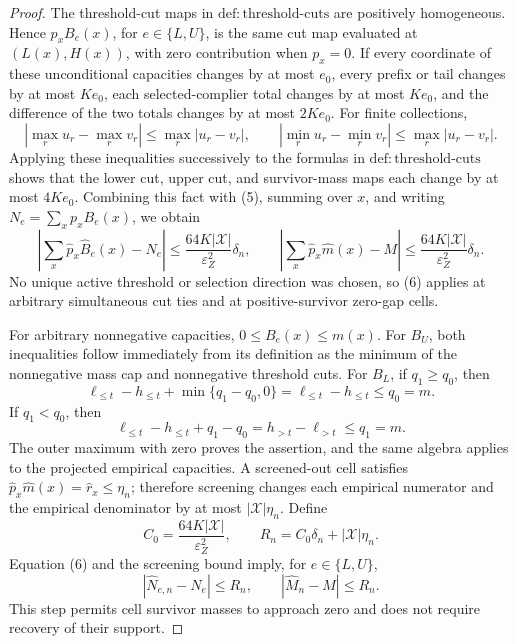 \documentclass{article}
\begin{document}
\begin{proof}
The threshold-cut maps in \(\mathrm{def{:}threshold\text{-}cuts}\) are positively homogeneous.  Hence \(p_xB_e(x)\), for \(e\in\{L,U\}\), is the same cut map evaluated at \((L(x),H(x))\), with zero contribution when \(p_x=0\).  If every coordinate of these unconditional capacities changes by at most \(e_0\), every prefix or tail changes by at most \(Ke_0\), each selected-complier total changes by at most \(Ke_0\), and the difference of the two totals changes by at most \(2Ke_0\).  For finite collections,
\[
|\max_r u_r-\max_r v_r|\le\max_r|u_r-v_r|,
\qquad
|\min_r u_r-\min_r v_r|\le\max_r|u_r-v_r|.
\]
Applying these inequalities successively to the formulas in \(\mathrm{def{:}threshold\text{-}cuts}\) shows that the lower cut, upper cut, and survivor-mass maps each change by at most \(4Ke_0\).  Combining this fact with (5), summing over \(x\), and writing \(N_e=\sum_xp_xB_e(x)\), we obtain
\[
\left|\sum_x\widehat p_x\widehat B_e(x)-N_e\right|
\le\frac{64K|\mathcal X|}{\varepsilon_Z^2}\delta_n,
\qquad
\left|\sum_x\widehat p_x\widehat m(x)-M\right|
\le\frac{64K|\mathcal X|}{\varepsilon_Z^2}\delta_n.
\tag{6}
\]
No unique active threshold or selection direction was chosen, so (6) applies at arbitrary simultaneous cut ties and at positive-survivor zero-gap cells.

For arbitrary nonnegative capacities, \(0\le B_e(x)\le m(x)\).  For \(B_U\), both inequalities follow immediately from its definition as the minimum of the nonnegative mass cap and nonnegative threshold cuts.  For \(B_L\), if \(q_1\ge q_0\), then
\[
\ell_{\le t}-h_{\le t}+\min\{q_1-q_0,0\}
=\ell_{\le t}-h_{\le t}\le q_0=m.
\]
If \(q_1<q_0\), then
\[
\ell_{\le t}-h_{\le t}+q_1-q_0
=h_{>t}-\ell_{>t}\le q_1=m.
\]
The outer maximum with zero proves the assertion, and the same algebra applies to the projected empirical capacities.  A screened-out cell satisfies \(\widehat p_x\widehat m(x)=\widehat r_x\le\eta_n\); therefore screening changes each empirical numerator and the empirical denominator by at most \(|\mathcal X|\eta_n\).  Define
\[
C_0=\frac{64K|\mathcal X|}{\varepsilon_Z^2},
\qquad
R_n=C_0\delta_n+|\mathcal X|\eta_n.
\]
Equation (6) and the screening bound imply, for \(e\in\{L,U\}\),
\[
|\widehat N_{e,n}-N_e|\le R_n,
\qquad
|\widehat M_n-M|\le R_n.
\tag{7}
\]
This step permits cell survivor masses to approach zero and does not require recovery of their support.


\end{proof}
\end{document}
